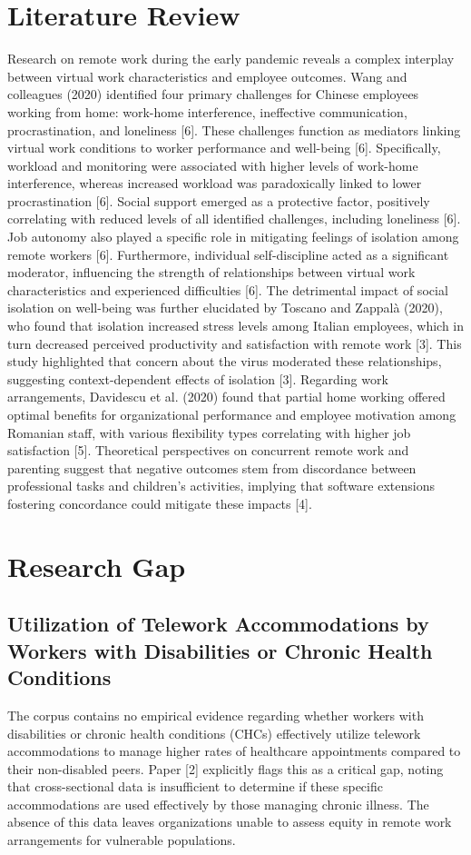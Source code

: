 \documentclass[11pt]{article}
\begin{document}
\section{Literature Review}
Research on remote work during the early pandemic reveals a complex interplay between virtual work characteristics and employee outcomes. Wang and colleagues (2020) identified four primary challenges for Chinese employees working from home: work-home interference, ineffective communication, procrastination, and loneliness [6]. These challenges function as mediators linking virtual work conditions to worker performance and well-being [6]. Specifically, workload and monitoring were associated with higher levels of work-home interference, whereas increased workload was paradoxically linked to lower procrastination [6]. Social support emerged as a protective factor, positively correlating with reduced levels of all identified challenges, including loneliness [6]. Job autonomy also played a specific role in mitigating feelings of isolation among remote workers [6]. Furthermore, individual self-discipline acted as a significant moderator, influencing the strength of relationships between virtual work characteristics and experienced difficulties [6]. The detrimental impact of social isolation on well-being was further elucidated by Toscano and Zappalà (2020), who found that isolation increased stress levels among Italian employees, which in turn decreased perceived productivity and satisfaction with remote work [3]. This study highlighted that concern about the virus moderated these relationships, suggesting context-dependent effects of isolation [3]. Regarding work arrangements, Davidescu et al. (2020) found that partial home working offered optimal benefits for organizational performance and employee motivation among Romanian staff, with various flexibility types correlating with higher job satisfaction [5]. Theoretical perspectives on concurrent remote work and parenting suggest that negative outcomes stem from discordance between professional tasks and children's activities, implying that software extensions fostering concordance could mitigate these impacts [4].

\section{Research Gap}
\subsection{Utilization of Telework Accommodations by Workers with Disabilities or Chronic Health Conditions}
The corpus contains no empirical evidence regarding whether workers with disabilities or chronic health conditions (CHCs) effectively utilize telework accommodations to manage higher rates of healthcare appointments compared to their non-disabled peers. Paper [2] explicitly flags this as a critical gap, noting that cross-sectional data is insufficient to determine if these specific accommodations are used effectively by those managing chronic illness. The absence of this data leaves organizations unable to assess equity in remote work arrangements for vulnerable populations.
\end{document}
